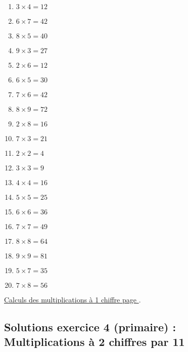 \begin{enumerate}[label=S\arabic*)]
    \item \(3\times 4 = 12 \)
    \item \(6\times 7 = 42 \)
    \item \(8\times 5 = 40 \)
    \item \(9\times 3 = 27 \)
    \item \(2\times 6 = 12 \)
    \item \(6\times 5 = 30 \)
    \item \(7\times 6 = 42 \)
    \item \(8\times 9 = 72 \)
    \item \(2\times 8 = 16 \)
    \item \(7\times 3 = 21 \)
    \item \(2\times 2 = 4 \)
    \item \(3\times 3 = 9 \)
    \item \(4\times 4 = 16 \)
    \item \(5\times 5 = 25 \)
    \item \(6\times 6 = 36\)
    \item \(7\times 7 = 49\)
    \item \(8\times 8 = 64\)
    \item \(9\times 9 = 81\)
    \item \(5\times 7 = 35\)
    \item \(7\times 8 = 56\)
\end{enumerate}    

\hyperref[calc:niveau3]{Calculs des multiplications à 1 chiffre page \pageref{calc:niveau3}}.

\newpage 


\subsection{Solutions exercice 4 (primaire) : Multiplications à 2 chiffres par 11}

\label{sol:niveau4}

